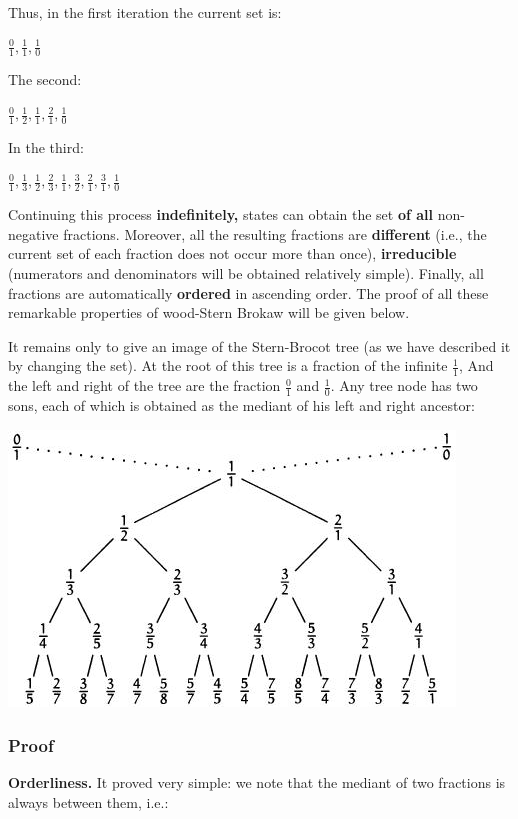 Thus, in the first iteration the current set is:

$\frac {0} {1}, \frac {1} {1}, \frac {1} {0}$

The second:

$\frac{0}{1},\frac{1}{2},\frac{1}{1},\frac{2}{1},\frac{1}{0}$

In the third:

$\frac{0}{1},\frac{1}{3},\frac{1}{2},\frac{2}{3},\frac{1}{1},\frac{3}{2},\frac{2}{1},\frac{3}{1},\frac{1}{0}$

Continuing this process \textbf{indefinitely,} states can obtain the set \textbf{of all} non-negative fractions. Moreover, all the resulting fractions are \textbf{different} (i.e., the current set of each fraction does not occur more than once), \textbf{irreducible} (numerators and denominators will be obtained relatively simple). Finally, all fractions are automatically \textbf{ordered} in ascending order. The proof of all these remarkable properties of wood-Stern Brokaw will be given below.

It remains only to give an image of the Stern-Brocot tree (as we have described it by changing the set). At the root of this tree is a fraction of the infinite $\frac {1} {1}$, And the left and right of the tree are the fraction $\frac {0} {1}$ and $\frac {1} {0}$. Any tree node has two sons, each of which is obtained as the mediant of his left and right ancestor:

\includegraphics[scale=0.6]{2.jpg}

\subsubsection{ Proof }

\textbf{Orderliness.} It proved very simple: we note that the mediant of two fractions is always between them, i.e.:

